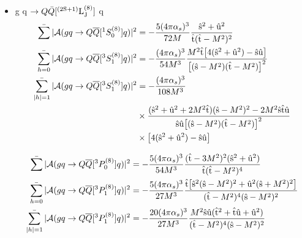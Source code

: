 \documentclass[aps,prc,preprint,superscriptaddress,showpacs,showkeys,amsmath]{revtex4-1}
\begin{document}
\begin{itemize}
\item g q $\rightarrow Q{\bar{Q}}[{\rm ^{(2S+1)}L_{J}^{(8)}}]$ q
\begin{equation}
\begin{split}
\mathop{{\bar{\sum}}} | {\cal A}(gq \to {Q{\overline Q}[ ^1S_0^{(8)}]} q) |^2 &=-{5 (4\pi {\alpha_{s}})^3 \over 72 M} {\hat{\rm s}^2+\hat{\rm u}^2 \over \hat{\rm t} (\hat{\rm t}-M^2)^2}\\
\mathop{{\bar{\sum_{h=0}}}} | {\cal A}(gq \to Q{\overline Q}[ ^3S_1^{(8)}] q) |^2 &=-{(4\pi {\alpha_{s}})^3 \over 54 M^3} {M^2 \hat{\rm t}\bigl[4(\hat{\rm s}^2+\hat{\rm u}^2)-\hat{\rm s}\hat{\rm u}\bigr] \over 
  \bigl[(\hat{\rm s}-M^2)(\hat{\rm t}-M^2)\bigr]^2}\\
\mathop{{\bar{\sum_{|h|=1}}}} | {\cal A}(gq \to Q{\overline Q}[ ^3S_1^{(8)}] q) |^2 &=-{(4\pi {\alpha_{s}})^3 \over 108 M^3} \\
                                   &\times {(\hat{\rm s}^2+\hat{\rm u}^2+2 M^2 \hat{\rm t})(\hat{\rm s}-M^2)^2- 2 M^2 \hat{\rm s}\hat{\rm t}\hat{\rm u}\over \hat{\rm s}\hat{\rm u}\bigl[(\hat{\rm s}-M^2)(\hat{\rm t}-M^2)\bigr]^2} \\
                                   & \times \bigl[4(\hat{\rm s}^2+\hat{\rm u}^2)-\hat{\rm s}\hat{\rm u}\bigr]
\end{split}  
\end{equation}

\begin{equation}
\begin{split}
\mathop{{\bar{\sum}}} | {\cal A}(gq \to Q{\overline Q}[ ^3P_0^{(8)}] q) |^2 &=-{5 (4\pi {\alpha_{s}})^3 \over 54 M^3} {(\hat{\rm t}-3 M^2)^2(\hat{\rm s}^2+\hat{\rm u}^2) \over \hat{\rm t}(\hat{\rm t}-M^2)^4}\\ 
\mathop{{\bar{\sum_{h=0}}}} | {\cal A}(gq \to Q{\overline Q}[ ^3P_1^{(8)}] q) |^2 &=-{5 (4\pi {\alpha_{s}})^3 \over 27 M^3} 
       {\hat{\rm t} \bigl[\hat{\rm s}^2(\hat{\rm s}-M^2)^2 + \hat{\rm u}^2(\hat{\rm s}+M^2)^2 \bigr] \over(\hat{\rm t}-M^2)^4 (\hat{\rm s}-M^2)^2}\\
\mathop{{\bar{\sum_{|h|=1}}}} | {\cal A}(gq \to Q{\overline Q}[ ^3P_1^{(8)}] q) |^2 &=-{20 (4\pi {\alpha_{s}})^3 \over 27 M^3} 
       {M^2 \hat{\rm s} \hat{\rm u}(\hat{\rm t}^2+\hat{\rm t}\hat{\rm u}+\hat{\rm u}^2) \over (\hat{\rm t}-M^2)^4 (\hat{\rm s}-M^2)^2}
\end{split}  
\end{equation}


\end{itemize}
\end{document}
